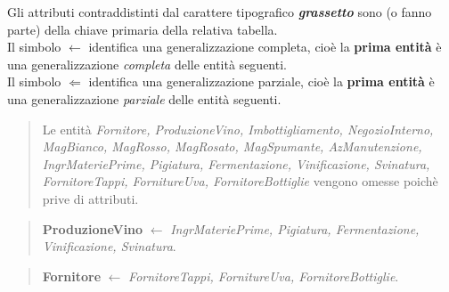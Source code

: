 Gli attributi contraddistinti dal carattere tipografico \textbf{\emph{grassetto}} sono (o fanno parte) della chiave primaria della relativa tabella. \\
Il simbolo $\gets$ identifica una generalizzazione completa, cioè la \textbf{prima entità} è una generalizzazione \emph{completa} delle entità seguenti.\\
Il simbolo $\Leftarrow$ identifica una generalizzazione parziale, cioè la \textbf{prima entità} è una generalizzazione \emph{parziale} delle entità seguenti.

\begin{verse}
	Le entità \emph{Fornitore, ProduzioneVino, Imbottigliamento, NegozioInterno, MagBianco, MagRosso, MagRosato, MagSpumante, AzManutenzione, IngrMateriePrime, Pigiatura, Fermentazione, Vinificazione, Svinatura, FornitoreTappi, FornitureUva, FornitoreBottiglie} vengono omesse poichè prive di attributi.
\end{verse}
\begin{verse}
	\textbf{ProduzioneVino} $\gets$ \emph{IngrMateriePrime, Pigiatura, Fermentazione, Vinificazione, Svinatura}.
\end{verse}
\begin{verse}
	\textbf{Fornitore} $\gets$ \emph{FornitoreTappi, FornitureUva, FornitoreBottiglie}.
\end{verse}

